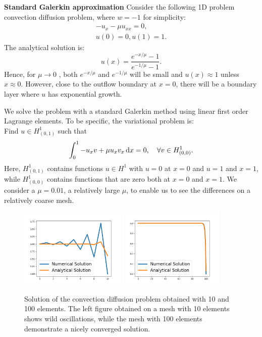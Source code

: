 \begin{example}{\textbf{Standard Galerkin approximation}} \label{ex1} 
Consider the following 1D problem convection diffusion problem, where $w=-1$ for simplicity: 
\begin{eqnarray}
-u_x - \mu u_{xx} = 0, \\ 
u(0) = 0, u(1) = 1 . 
\end{eqnarray}
The analytical solution is: 
\[
u(x) = \frac{e^{-x/\mu} - 1}{e^{-1/\mu} - 1}. 
\]
Hence, for $\mu \rightarrow 0$ , both $e^{-x/\mu}$ and $e^{-1/\mu}$ 
will be small and $u(x) \approx 1$ unless $x\approx 0$. However, close to the 
outflow boundary at $x=0$, there will be a boundary layer where $u$ has exponential growth. 

We solve the problem with a standard Galerkin method using linear first
order Lagrange elements. To be specific, the variational problem is: \\    
Find $u \in H^1_{(0,1)}$ such that 
\[
\int_0^1 -u_x v + \mu u_x v_x \, \mathrm{d}x   = 0, \quad \forall v \in H^1_{(0,0)} .  
\]
Here, $H^1_{(0,1)}$ contains functions $u\in H^1$ with $u=0$ at $x=0$ and $u=1$ and $x=1$, while
$H^1_{(0,0)}$ contains functions that are zero both at $x=0$ and $x=1$. We
consider a $\mu=0.01$, a relatively large $\mu$, to enable us to see the
differences on a relatively coarse mesh.     

\begin{figure}
\begin{center}
\includegraphics[width=0.45\textwidth]{chapters/conv-diff/plots/conv-diff.png}
\includegraphics[width=0.45\textwidth]{chapters/conv-diff/plots/conv-diff-hr.png}
\caption{Solution of the convection diffusion problem obtained with 10 and 100 elements. 
The left figure obtained on a mesh with 10 elements shows wild oscillations, while the 
mesh with 100 elements demonstrate a nicely converged solution.
}
\label{fig:conv1}
\end{center}
\end{figure}


\end{example}
